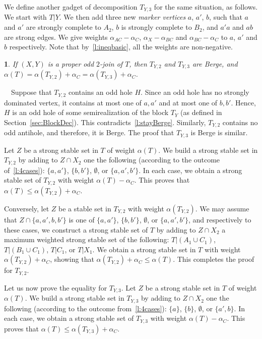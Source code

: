 \documentclass[11 pt] {article}
\newtheorem{lemma}[theorem]{}
\newcounter{claim}
\newcommand{\Proof}{\setcounter{claim}{0}\noindent{\bf Proof.}\ \ }
\begin{document}
We define another gadget of decomposition $T_{Y,3}$ for the same
situation, as follows. We start with $T |Y$. We then add three new
\emph{marker vertices} $a$, $a'$, $b$, such that $a$ and $a'$ are
strongly complete to $A_2$, $b$ is strongly complete to $B_2$, and
$a'a$ and $ab$ are strong edges.  We give weights $\alpha_{AC} -
\alpha_{C}$, $\alpha_{X} - \alpha_{BC}$ and $\alpha_{BC} - \alpha_{C}$
to $a$, $a'$ and $b$ respectively.  Note that by~\ref{l:ineqbasic},
all the weights are non-negative.


\begin{lemma}
  \label{l:oddblock3}
  If $(X, Y)$ is a proper odd $2$-join of $T$, then $T_{Y, 2}$ and
  $T_{Y, 3}$ are Berge, and $\alpha(T) = \alpha(T_{Y, 2}) + \alpha_C =
  \alpha(T_{Y, 3}) + \alpha_C$.
\end{lemma}

\Proof Suppose that $T_{Y, 2}$ contains an odd hole $H$.  Since an odd
hole has no strongly dominated vertex, it contains at most one of $a,
a'$ and at most one of $b, b'$.  Hence, $H$ is an odd hole of some
semirealization of the block $T_Y$ (as defined in
Section~\ref{sec:BlockDec}). This contradicts~\ref{l:stayBerge}.
Similarly, $T_{Y, 2}$ contains no odd antihole, and therefore, it is
Berge.  The proof that $T_{Y, 3}$ is Berge is similar.

Let $Z$ be a strong stable set in $T$ of weight $\alpha(T)$.  We build
a strong stable set in $T_{Y, 2}$ by adding to $Z \cap X_2$ one the
following (according to the outcome of~\ref{l:4cases}): $\{a, a'\}$,
$\{b, b'\}$, $\emptyset$, or $\{a, a', b'\}$.  In each case, we obtain
a strong stable set of $T_{Y, 2}$ with weight $\alpha(T) - \alpha_C$.
This proves that $\alpha(T) \leq \alpha(T_{Y, 2}) + \alpha_C$.

Conversely, let $Z$ be a stable set in $T_{Y, 2}$ with weight
$\alpha(T_{Y, 2})$.  We may assume that $Z \cap \{a, a', b, b'\}$ is
one of $\{a, a'\}$, $\{b, b'\}$, $\emptyset$, or $\{a, a', b'\}$, and
respectively to these cases, we construct a strong stable set of $T$
by adding to $Z\cap X_2$ a maximum weighted strong stable set of the
following: $T|(A_1 \cup C_1)$,  $T|(B_1 \cup C_1)$, $T|C_1$, or
$T|X_1$.  We obtain a strong stable set in $T$ with weight
$\alpha(T_{Y, 2}) + \alpha_C$, showing that  $\alpha(T_{Y, 2}) +
\alpha_C \leq \alpha(T)$. This completes the proof for $T_{Y, 2}$. 

Let us now prove the equality for $T_{Y, 3}$.  Let $Z$ be a strong
stable set in $T$ of weight $\alpha(T)$.  We build a strong stable set
in $T_{Y, 3}$ by adding to $Z \cap X_2$ one the following (according
to the outcome from~\ref{l:4cases}): $\{a\}$, $\{b\}$, $\emptyset$, or
$\{a', b\}$.  In each case, we obtain a strong stable set of $T_{Y,
  3}$ with weight $\alpha(T) - \alpha_C$.  This proves that $\alpha(T)
\leq \alpha(T_{Y, 3}) + \alpha_C$.
\end{document}
